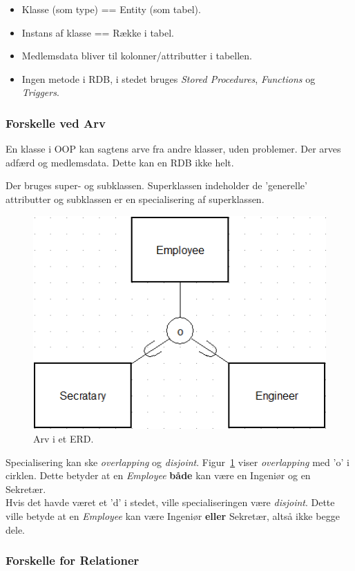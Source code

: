 \begin{itemize}
	\item Klasse (som type) == Entity (som tabel). 
	\item Instans af klasse == Række i tabel.
	\item Medlemsdata bliver til kolonner/attributter i tabellen.
	\item Ingen metode i RDB, i stedet bruges \textit{Stored Procedures}, \textit{Functions} og \textit{Triggers}.
\end{itemize}

\subsubsection{Forskelle ved Arv}\label{sec:arv}
En klasse i OOP kan sagtens arve fra andre klasser, uden problemer. Der arves adfærd og medlemsdata. Dette kan en RDB ikke helt.

Der bruges super- og subklassen. Superklassen indeholder de 'generelle' attributter og subklassen er en specialisering af superklassen.

\begin{figure}[H]
\centering
\includegraphics[width=0.5\linewidth]{figs/spm3/arv}
\caption{Arv i et ERD. }
\label{fig:arv}
\end{figure}

Specialisering kan ske \textit{overlapping} og \textit{disjoint}. 
Figur~\ref{fig:arv} viser \textit{overlapping} med 'o' i cirklen. Dette betyder at en \textit{Employee} \textbf{både} kan være en Ingeniør og en Sekretær.\\

Hvis det havde været et 'd' i stedet, ville specialiseringen være \textit{disjoint}. Dette ville betyde at en \textit{Employee} kan være Ingeniør \textbf{eller} Sekretær, altså ikke begge dele. 


\subsubsection{Forskelle for Relationer}

